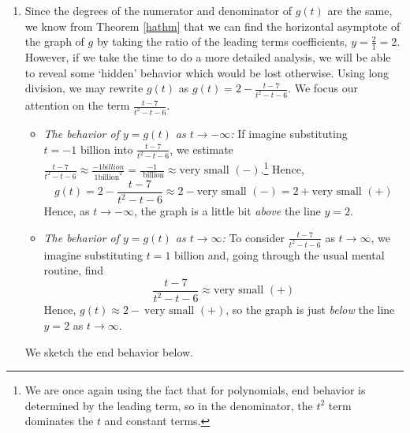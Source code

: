\documentclass{ximera}
\begin{document}
\begin{example}
\begin{enumerate}
\item  Since the degrees of the numerator and denominator of $g(t)$ are the same, we know from Theorem \ref{hathm} that we can find the horizontal asymptote of the graph of $g$ by taking the ratio of the leading terms coefficients, $y = \frac{2}{1} = 2$.  However, if we take the time to do a more detailed analysis, we will be able to reveal some `hidden' behavior which would be lost otherwise.  Using long division, we may rewrite $g(t)$ as $g(t) = 2 - \frac{t-7}{t^2-t-6}.$  We focus our attention on the term $\frac{t-7}{t^2-t-6}$.  

\begin{itemize}

\item  \textit{The behavior of $y=g(t)$ as $t \rightarrow -\infty$:} If imagine substituting $t = \text{$-1$ billion}$ into $\frac{t-7}{t^2-t-6}$, we estimate $\frac{t-7}{t^2-t-6} \approx \frac{-1 { billion}}{1 \text{billion}^2}  = \frac{-1}{\text{ billion}} \approx \text{very small $(-)$}$.\footnote{We are once again using the fact that for polynomials, end behavior is determined by the leading term, so in the denominator, the $t^2$ term dominates the $t$ and constant terms.}  Hence, \[g(t) =  2 - \frac{t-7}{t^2-t-6} \approx 2 - \text{very small $(-)$} = 2 + \text{very small $(+)$}\]  Hence, as $t \rightarrow -\infty$, the graph is a little bit \textit{above} the line $y=2$.

\item  \textit{The behavior of $y=g(t)$ as $t \rightarrow \infty$:}  To consider $\frac{t-7}{t^2-t-6}$ as $t \rightarrow \infty$, we imagine substituting $t= \text{$1$ billion}$ and, going through the usual mental routine, find \[\frac{t-7}{t^2-t-6} \approx \text{very small $(+)$}\]  Hence, $g(t) \approx 2 - \ \text{very small $(+)$}$, so the graph is just \textit{below} the line $y=2$ as $t \rightarrow \infty$.

\end{itemize}

We sketch the end behavior below.

\begin{image}
\end{image}
\end{enumerate}
\end{example}
\end{document}
